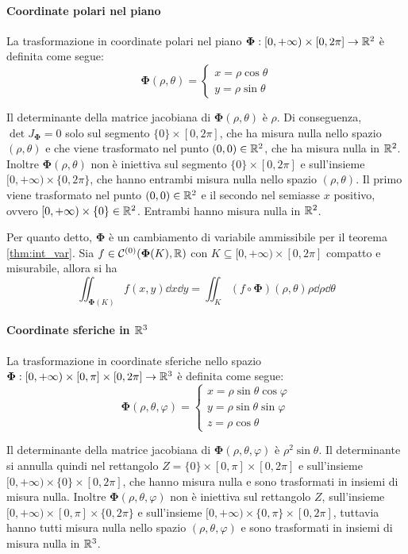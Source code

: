 \paragraph{Coordinate polari nel piano}
La trasformazione in coordinate polari nel piano $\bm\Phi:[0,+\infty)\times[0,2\pi]\to\mathbb{R}^2$ è definita come segue:
$$\bm\Phi(\rho,\theta)=
\begin{cases}
    x=\rho \cos \theta\\
    y=\rho \sin \theta
\end{cases}
$$

Il determinante della matrice jacobiana di $\bm\Phi(\rho,\theta)$ è $\rho$. Di conseguenza, $\det J_{\bm\Phi}=0$ solo sul segmento $\{0\}\times[0,2\pi]$, che ha misura nulla nello spazio $(\rho,\theta)$ e che viene trasformato nel punto $(0,0)\in\mathbb{R}^2$, che ha misura nulla in $\mathbb{R}^2$.
Inoltre $\bm\Phi(\rho,\theta)$ non è iniettiva sul segmento $\{0\}\times[0,2\pi]$ e sull'insieme $[0,+\infty)\times\{0,2\pi\}$, che hanno entrambi misura nulla nello spazio $(\rho,\theta)$. Il primo viene trasformato nel punto $(0,0)\in\mathbb{R}^2$ e il secondo nel semiasse $x$ positivo, ovvero $[0,+\infty)\times\{0\} \in \mathbb{R}^2$. Entrambi hanno misura nulla in $\mathbb{R}^2$.

Per quanto detto, $\bm\Phi$ è un cambiamento di variabile ammissibile per il teorema \ref{thm:int_var}. Sia $f\in \mathcal{C}^{(0)}(\bm\Phi(K),\mathbb{R})$ con $K\subseteq[0,+\infty)\times[0,2\pi]$ compatto e misurabile, allora si ha
$$\iint_{\bm\Phi(K)} f(x,y)\dd x \dd y=\iint_K (f\circ \bm\Phi)(\rho,\theta)\rho\dd \rho \dd \theta$$

\paragraph{Coordinate sferiche in $\mathbb{R}^3$}
La trasformazione in coordinate sferiche nello spazio $\bm\Phi:[0,+\infty)\times[0,\pi]\times[0,2\pi] \to \mathbb{R}^3$ è definita come segue:
$$
\bm\Phi(\rho,\theta,\varphi)=
\begin{cases}
    x=\rho\sin\theta\cos\varphi\\
    y=\rho\sin\theta\sin\varphi\\
    z=\rho\cos\theta
\end{cases}
$$

Il determinante della matrice jacobiana di $\bm\Phi(\rho,\theta,\varphi)$ è $\rho^2\sin\theta$. Il determinante si annulla quindi nel rettangolo $Z=\{0\}\times[0,\pi]\times[0,2\pi]$ e sull'insieme $[0,+\infty)\times\{0\}\times[0,2\pi]$, che hanno misura nulla e sono trasformati in insiemi di misura nulla. Inoltre $\bm\Phi(\rho,\theta,\varphi)$ non è iniettiva sul rettangolo $Z$, sull'insieme $[0,+\infty)\times[0,\pi]\times\{0,2\pi\}$ e sull'insieme $[0,+\infty)\times\{0,\pi\}\times[0,2\pi]$, tuttavia hanno tutti misura nulla nello spazio $(\rho,\theta,\varphi)$ e sono trasformati in insiemi di misura nulla in $\mathbb{R}^3$.

